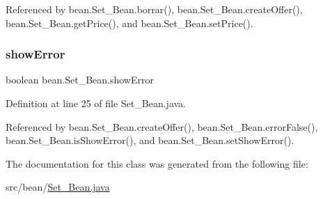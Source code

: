 Referenced by bean.\+Set\+\_\+\+Bean.\+borrar(), bean.\+Set\+\_\+\+Bean.\+create\+Offer(), bean.\+Set\+\_\+\+Bean.\+get\+Price(), and bean.\+Set\+\_\+\+Bean.\+set\+Price().

\mbox{\label{classbean_1_1Set__Bean_a1476ea0d0fa314e92ff99f9a9499e5c0}} 
\subsubsection{\texorpdfstring{showError}{showError}}
{\footnotesize\ttfamily boolean bean.\+Set\+\_\+\+Bean.\+show\+Error\hspace{0.3cm}{\ttfamily [package]}}



Definition at line 25 of file Set\+\_\+\+Bean.\+java.



Referenced by bean.\+Set\+\_\+\+Bean.\+create\+Offer(), bean.\+Set\+\_\+\+Bean.\+error\+False(), bean.\+Set\+\_\+\+Bean.\+is\+Show\+Error(), and bean.\+Set\+\_\+\+Bean.\+set\+Show\+Error().



The documentation for this class was generated from the following file\+:\begin{DoxyCompactItemize}
\item 
src/bean/\mbox{\hyperlink{Set__Bean_8java}{Set\+\_\+\+Bean.\+java}}\end{DoxyCompactItemize}
